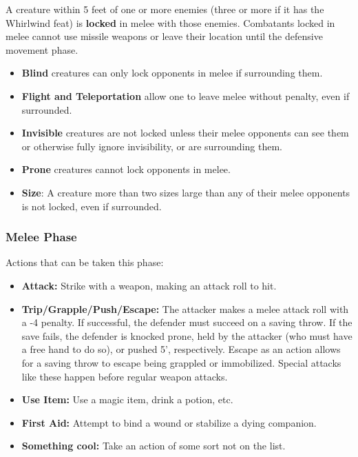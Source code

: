 \documentclass{book}
\providecommand{\tightlist}{%
\setlength{\itemsep}{0pt}\setlength{\parskip}{0pt}}
\begin{document}
A creature within 5 feet of one or more enemies (three or more if it has
the Whirlwind feat) is \textbf{locked} in melee with those enemies.
Combatants locked in melee cannot use missile weapons or leave their
location until the defensive movement phase.

\begin{itemize}
\tightlist
\item
  \textbf{Blind} creatures can only lock opponents in melee if
  surrounding them.
\item
  \textbf{Flight and Teleportation} allow one to leave melee without
  penalty, even if surrounded.
\item
  \textbf{Invisible} creatures are not locked unless their melee
  opponents can see them or otherwise fully ignore invisibility, or are
  surrounding them.
\item
  \textbf{Prone} creatures cannot lock opponents in melee.
\item
  \textbf{Size}: A creature more than two sizes large than any of their
  melee opponents is not locked, even if surrounded.
\end{itemize}

\subsubsection*{Melee Phase}\label{melee-phase}

Actions that can be taken this phase:

\begin{itemize}
\tightlist
\item
  \textbf{Attack:} Strike with a weapon, making an attack roll to hit.
\item
  \textbf{Trip/Grapple/Push/Escape:} The attacker makes a melee attack
  roll with a -4 penalty. If successful, the defender must succeed on a
  saving throw. If the save fails, the defender is knocked prone, held
  by the attacker (who must have a free hand to do so), or pushed 5',
  respectively. Escape as an action allows for a saving throw to escape
  being grappled or immobilized. Special attacks like these happen
  before regular weapon attacks.
\item
  \textbf{Use Item:} Use a magic item, drink a potion, etc.
\item
  \textbf{First Aid:} Attempt to bind a wound or stabilize a dying
  companion.
\item
  \textbf{Something cool:} Take an action of some sort not on the list.
\end{itemize}
\end{document}
